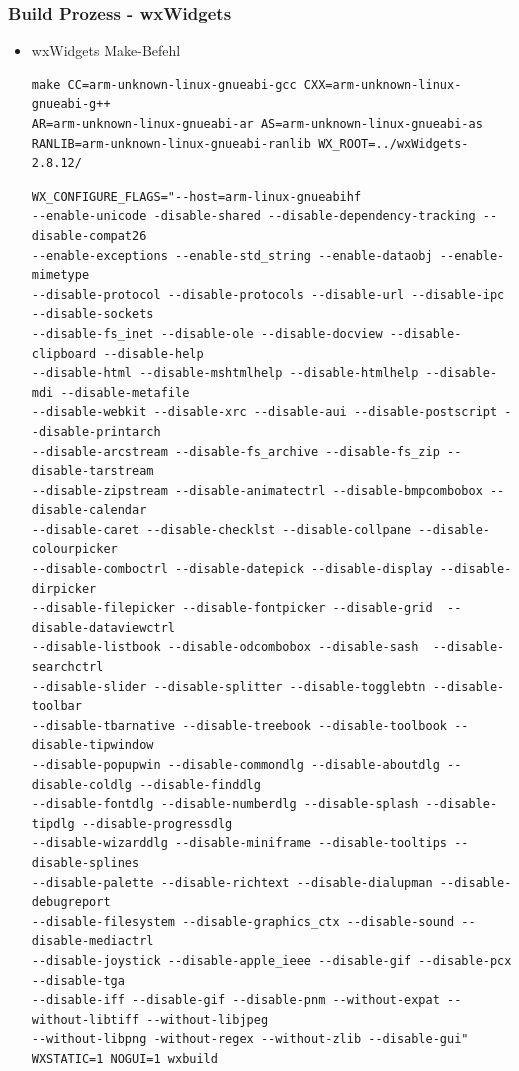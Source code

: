 \documentclass{beamer}
\begin{document}
\begin{frame}[fragile]
\frametitle{Build Prozess - wxWidgets}
\begin{itemize}
\item wxWidgets Make-Befehl
\begin{tiny}
\begin{verbatim}
make CC=arm-unknown-linux-gnueabi-gcc CXX=arm-unknown-linux-gnueabi-g++
AR=arm-unknown-linux-gnueabi-ar AS=arm-unknown-linux-gnueabi-as
RANLIB=arm-unknown-linux-gnueabi-ranlib WX_ROOT=../wxWidgets-2.8.12/
\end{verbatim}
\color{gray}
\begin{verbatim}
WX_CONFIGURE_FLAGS="--host=arm-linux-gnueabihf
--enable-unicode -disable-shared --disable-dependency-tracking --disable-compat26
--enable-exceptions --enable-std_string --enable-dataobj --enable-mimetype
--disable-protocol --disable-protocols --disable-url --disable-ipc --disable-sockets
--disable-fs_inet --disable-ole --disable-docview --disable-clipboard --disable-help
--disable-html --disable-mshtmlhelp --disable-htmlhelp --disable-mdi --disable-metafile
--disable-webkit --disable-xrc --disable-aui --disable-postscript --disable-printarch
--disable-arcstream --disable-fs_archive --disable-fs_zip --disable-tarstream
--disable-zipstream --disable-animatectrl --disable-bmpcombobox --disable-calendar
--disable-caret --disable-checklst --disable-collpane --disable-colourpicker
--disable-comboctrl --disable-datepick --disable-display --disable-dirpicker
--disable-filepicker --disable-fontpicker --disable-grid  --disable-dataviewctrl
--disable-listbook --disable-odcombobox --disable-sash  --disable-searchctrl
--disable-slider --disable-splitter --disable-togglebtn --disable-toolbar
--disable-tbarnative --disable-treebook --disable-toolbook --disable-tipwindow
--disable-popupwin --disable-commondlg --disable-aboutdlg --disable-coldlg --disable-finddlg
--disable-fontdlg --disable-numberdlg --disable-splash --disable-tipdlg --disable-progressdlg
--disable-wizarddlg --disable-miniframe --disable-tooltips --disable-splines
--disable-palette --disable-richtext --disable-dialupman --disable-debugreport
--disable-filesystem --disable-graphics_ctx --disable-sound --disable-mediactrl
--disable-joystick --disable-apple_ieee --disable-gif --disable-pcx --disable-tga
--disable-iff --disable-gif --disable-pnm --without-expat --without-libtiff --without-libjpeg
--without-libpng -without-regex --without-zlib --disable-gui"
WXSTATIC=1 NOGUI=1 wxbuild
\end{verbatim}
\end{tiny}
\end{itemize}
\end{frame}
\end{document}
